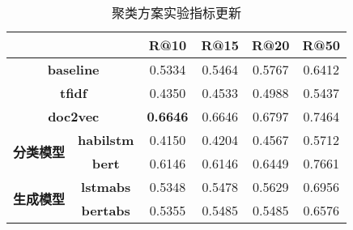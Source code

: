 \documentclass[11pt]{article}
\begin{document}
\begin{CJK}{UTF8}{gkai}
\begin{table}[htbp]
  \centering
  \begin{tabular}{c|c|c|c|c|c}
    \hline
    \multicolumn{2}{c|}{} & \textbf{R@10} & \textbf{R@15} & \textbf{R@20} & \textbf{R@50} \\
    \hline
    \multicolumn{2}{c|}{\textbf{baseline}} & 0.5334  & 0.5464  & 0.5767  & 0.6412  \\
    \hline
    \multicolumn{2}{c|}{\textbf{tfidf}} & 0.4350  & 0.4533  & 0.4988  & 0.5437  \\
    \hline
    \multicolumn{2}{c|}{\textbf{doc2vec}} & \textcolor[rgb]{ 1,  0,  0}{\textbf{0.6646 }} & 0.6646  & 0.6797  & 0.7464  \\
    \hline
    \multirow{2}[0]{*}{\textbf{分类模型}} & \textbf{habilstm} & 0.4150  & 0.4204  & 0.4567  & 0.5712  \\
    & \textbf{bert} & 0.6146  & 0.6146  & 0.6449  & 0.7661  \\
    \hline
    \multirow{2}[0]{*}{\textbf{生成模型}} & \textbf{lstmabs} & 0.5348  & 0.5478  & 0.5629  & 0.6956  \\
    & \textbf{bertabs} & 0.5355  & 0.5485  & 0.5485  & 0.6576  \\
    \hline
  \end{tabular}%
  \caption{聚类方案实验指标更新}
  \label{tab:addlabel}%
\end{table}%

\end{CJK}
\end{document}

